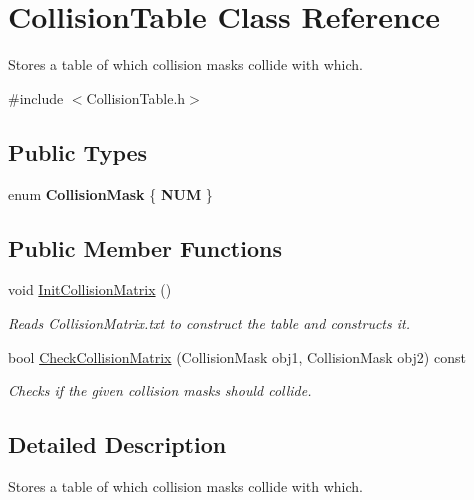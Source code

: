 \hypertarget{classCollisionTable}{}\section{Collision\+Table Class Reference}
\label{classCollisionTable}


Stores a table of which collision masks collide with which.  




{\ttfamily \#include $<$Collision\+Table.\+h$>$}

\subsection*{Public Types}
\begin{DoxyCompactItemize}
\item 
\mbox{\label{classCollisionTable_abec7701fa63dce6d59a0804b0ba1a69e}} 
enum {\bfseries Collision\+Mask} \{ {\bfseries N\+UM}
 \}
\end{DoxyCompactItemize}
\subsection*{Public Member Functions}
\begin{DoxyCompactItemize}
\item 
\mbox{\label{classCollisionTable_a1b9fda1f06ee74f2ac2539b8676322e4}} 
void \hyperlink{classCollisionTable_a1b9fda1f06ee74f2ac2539b8676322e4}{Init\+Collision\+Matrix} ()
\begin{DoxyCompactList}\small\item\em Reads Collision\+Matrix.\+txt to construct the table and constructs it. \end{DoxyCompactList}\item 
bool \hyperlink{classCollisionTable_a21c09fb6803e3da3deb9ea9b12648f27}{Check\+Collision\+Matrix} (Collision\+Mask obj1, Collision\+Mask obj2) const
\begin{DoxyCompactList}\small\item\em Checks if the given collision masks should collide. \end{DoxyCompactList}\end{DoxyCompactItemize}


\subsection{Detailed Description}
Stores a table of which collision masks collide with which. 

